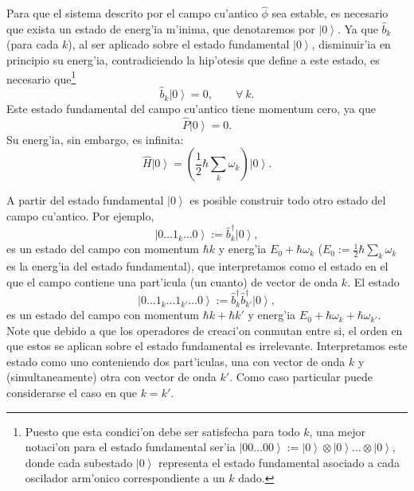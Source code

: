 Para que el sistema descrito por el campo cu'antico $\hat\phi$ sea estable, es
necesario que exista un estado de energ'ia m'inima, que denotaremos por
$\left|0\right> $. Ya que $\hat{b}_k$ (para cada $k$), al ser aplicado sobre el
estado fundamental $\left|0\right> $, disminuir'ia en principio su energ'ia,
contradiciendo la hip'otesis que define a este estado, es necesario
que\footnote{Puesto que esta condici'on debe ser satisfecha para todo $k$, una
mejor notaci'on para el estado fundamental ser'ia $\left|00\dots
00\right>:=\left|0\right>\otimes\left|0\right>\dots\otimes\left|0\right>$, donde
cada subestado $\left|0\right>$ representa el estado fundamental asociado a cada
oscilador arm'onico correspondiente a un $k$ dado.}
\begin{equation}
\hat{b}_k\left|0\right> =0, \qquad \forall\ k .
\end{equation}
Este estado fundamental del campo cu'antico tiene momentum cero, ya que
\begin{equation}
\hat{P}\left|0\right> =0.
\end{equation}
Su energ'ia, sin embargo, es infinita:
\begin{equation}
\hat{H}\left|0\right> =\left( \frac{1}{2}\hbar\sum_k \omega_k \right)
\left|0\right>.
\end{equation}

A partir del estado fundamental $\left|0\right>$ es posible construir todo otro
estado del campo cu'antico. Por ejemplo,
\begin{equation}
\left|0\dots 1_k\dots 0\right>:=\hat{b}^\dagger _k\left|0\right>,
\end{equation}
es un estado del campo con momentum $\hbar k$ y energ'ia $E_0+\hbar\omega_k$
($E_0:= \frac{1}{2}\hbar\sum_k \omega_k$ es la energ'ia del estado
fundamental), que interpretamos como el estado en el que el campo contiene una
part'icula (un cuanto) de vector de onda $k$. El estado
\begin{equation}
\left|0\dots 1_k\dots 1_{k'}\dots 0\right>:=\hat{b}^\dagger _k\hat{b}^\dagger
_{k'}\left|0\right>,
\end{equation}
es un estado del campo con momentum $\hbar k+\hbar k'$ y energ'ia
$E_0+\hbar\omega_k+\hbar\omega_{k'}$. Note que debido a que los operadores de
creaci'on conmutan entre si, el orden en que estos se aplican sobre el estado
fundamental es irrelevante. Interpretamos este estado como uno conteniendo dos
part'iculas, una con vector de onda $k$ y (simultaneamente) otra con vector de
onda $k'$. Como caso particular puede considerarse el caso en que $k=k'$.

